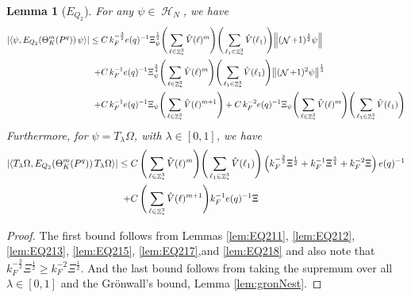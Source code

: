 \documentclass[sn-mathphys, Numbered ,a4paper]{sn-jnl}%
\DeclareMathOperator{\Z}{\mathbb{Z}}
\DeclareMathOperator{\HH}{\mathcal{H}}
\DeclareMathOperator{\NN}{\mathcal{N}}
\newcommand{\half}{\frac{1}{2}}
\newcommand{\eva}[1]{\left\langle #1 \right\rangle}
\theoremstyle{plain}
\newtheorem{lemma}[theorem]{Lemma}
\theoremstyle{definition}
\theoremstyle{remark}
\theoremstyle{plain}
\theoremstyle{definition}
\theoremstyle{remark}
\begin{document}
\begin{lemma}[$E_{Q_2}$]\label{lem:finEQ2est}
    For any $\psi \in \HH_N$, we have
    \begin{align}
    	\abs{\eva{\psi, E_{Q_2}\!\left(\Theta^m_K(P^q)\right)  \psi}} \leq \; &C\,  k_{F}^{-\frac{3}{2}} e(q)^{-1} \Xi_{\psi}^\half \Bigg(\sum\limits_{\ell \in \Z^3_*} \hat{V}(\ell)^m\Bigg)\Bigg( \sum\limits_{\ell_1 \in \Z^3_*} \hat{V}(\ell_1) \Bigg) \norm { (\NN+1)^{\frac{3}{2}} \psi }\nonumber\\
    	\quad+ &C\, k_{F}^{-1} e(q)^{-1} \Xi_{\psi}^{\frac{3}{4}} \Bigg(\sum\limits_{\ell \in \Z^3_*} \hat{V}(\ell)^m\Bigg) \Bigg(\sum\limits_{\ell_1 \in \Z^3_*} \hat{V}(\ell_1) \Bigg)  \norm{ (\NN+1)^2\psi}^\half \nonumber\\ 
    	\quad+ &C\, k_{F}^{-1} e(q)^{-1} \Xi_{\psi} \Bigg(\sum\limits_{\ell \in \Z^3_*} \hat{V}(\ell)^{m+1}\Bigg) + C\, k_{F}^{-2} e(q)^{-1} \Xi_{\psi} \Bigg(\sum\limits_{\ell \in \Z^3_*} \hat{V}(\ell)^m\Bigg) \Bigg(\sum\limits_{\ell_1 \in \Z^3_*} \hat{V}(\ell_1) \Bigg) \label{eq:genEQ2est}
    \end{align}
    Furthermore, for $\psi = T_{\lambda}\Omega$, with $\lambda \in [0,1]$, we have 
    \begin{align}
    	\abs{\eva{ T_{\lambda}\Omega, E_{Q_2}\!\left(\Theta^m_K(P^q) \right)  T_{\lambda}\Omega}} \leq \; &C\,  \Bigg(\sum\limits_{\ell \in \Z^3_*} \hat{V}(\ell)^m\Bigg)\Bigg( \sum\limits_{\ell_1 \in \Z^3_*} \hat{V}(\ell_1) \Bigg)\left( k_{F}^{-\frac{3}{2}} \Xi^\half 
    	+ k_{F}^{-1}\Xi^{\frac{3}{4}} + k_{F}^{-2}\Xi \right)e(q)^{-1} \nonumber\\
    	\quad + &C\, \Bigg(\sum\limits_{\ell \in \Z^3_*} \hat{V}(\ell)^{m+1}\Bigg)  k_{F}^{-1} e(q)^{-1} \Xi \label{eq:finalEQ2est}
    \end{align}
\end{lemma}
\begin{proof}
    	The first bound follows from Lemmas \ref{lem:EQ211}, \ref{lem:EQ212}, \ref{lem:EQ213}, \ref{lem:EQ215}, \ref{lem:EQ217},and \ref{lem:EQ218} and also note that $k_{F}^{-\frac{3}{2}} \Xi^\half 
    	\geq k_{F}^{-2} \Xi^\half $. And the last bound follows from taking the supremum over all $\lambda \in [0,1]$ and the Gr\"onwall's bound, Lemma \ref{lem:gronNest}. 
\end{proof}
\end{document}

